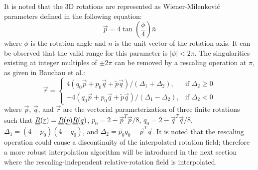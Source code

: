 It is noted that the 3D rotations are represented as Wiener-Milenkovi\'c parameters \cite{Bauchau-etal:2008,Wang:GEBT2013} defined in the following equation:
 \begin{equation}
     \vec{p} = 4 \tan\left(\frac{\phi}{4} \right) \bar{n} 
     \label{WMParameter}
 \end{equation}
where $\phi$ is the rotation angle and $\bar{n}$ is the unit vector of the
rotation axis. It can be observed that the valid range for this parameter is
$|\phi| < 2 \pi$. The singularities existing at integer multiples of $\pm 2 \pi$ can be removed by a rescaling operation at $\pi$, as given
in Bauchau et al.\cite{Bauchau-etal:2008}:
\begin{equation}
    \label{RescaledWM}
    \vec{r} = \begin{cases}
    4(q_0\vec{p} + p_0 \vec{q} + \tilde{p} \vec{q} ) / (\Delta_1 + \Delta_2), & \text{if } \Delta_2 \geq 0 \\
    -4(q_0\vec{p} + p_0 \vec{q} + \tilde{p} \vec{q} ) / (\Delta_1 - \Delta_2), & \text{if } \Delta_2 < 0
    \end{cases}
\end{equation}
where $\vec{p}$, $\vec{q}$, and $\vec{r}$ are the vectorial parameterization of three finite rotations such that $\underline{\underline{R}}(\underline{r}) = \underline{\underline{R}}(\underline{p}) \underline{\underline{R}}(\underline{q})$, $p_0 = 2 - \vec{p}^T \vec{p}/8$, $q_0 = 2 - \vec{q}^T \vec{q}/8$, $\Delta_1 = (4-p_0)(4-q_0)$, and $\Delta_2 = p_0 q_0 - \vec{p}^T \vec{q}$.
It is noted that the rescaling operation could cause a discontinuity of the
interpolated rotation field; therefore a more robust interpolation algorithm
will be introduced in the next section where the rescaling-independent
relative-rotation field is interpolated. 
